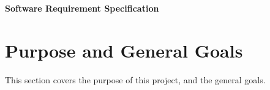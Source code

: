 




\textbf{Software Requirement Specification} \\

\section{Purpose and General Goals}
This section covers the purpose of this project, and the general goals.






